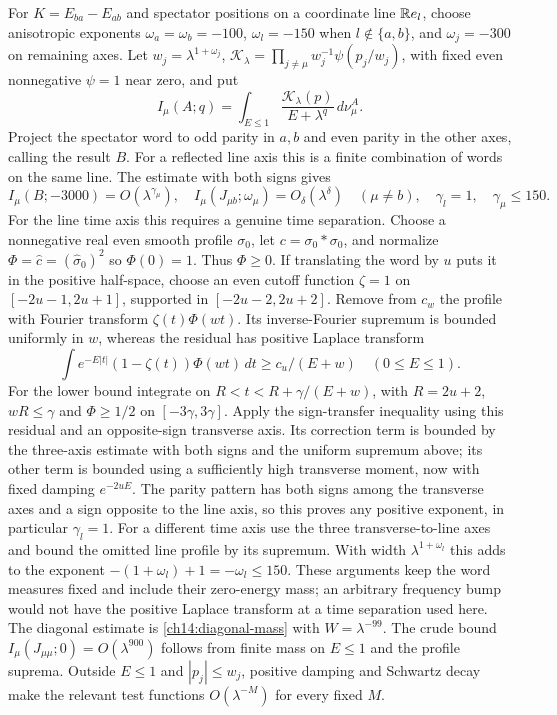For $K=E_{ba}-E_{ab}$ and spectator positions on a coordinate line
$\mathbb R e_l$, choose anisotropic exponents
$\omega_a=\omega_b=-100$, $\omega_l=-150$ when $l\notin\{a,b\}$,
and $\omega_j=-300$ on remaining axes. Let
$w_j=\lambda^{1+\omega_j}$,
$\mathcal K_\lambda=\prod_{j\ne\mu}w_j^{-1}\psi(p_j/w_j)$,
with fixed even nonnegative $\psi=1$ near zero, and put
\[
 I_\mu(A;q)=\int_{E\le1}\frac{\mathcal K_\lambda(p)}
                                  {E+\lambda^q}\,d\nu_\mu^A.
\]
Project the spectator word to odd parity in $a,b$ and even parity
in the other axes, calling the result $B$. For a reflected line
axis this is a finite combination of words on the same line.
The estimate with both signs gives
\[
 I_\mu(B;-3000)=O(\lambda^{\gamma_\mu}),\quad
 I_\mu(J_{\mu b};\omega_\mu)=O_\delta(\lambda^\delta)\quad(\mu\ne b),
 \quad\gamma_l=1,\quad\gamma_\mu\le150.
\]
For the line time axis this requires a genuine time separation.
Choose a nonnegative real even smooth profile $\sigma_0$, let
$c=\sigma_0*\sigma_0$, and normalize
$\Phi=\widehat c=(\widehat\sigma_0)^2$ so $\Phi(0)=1$.
Thus $\Phi\ge0$. If translating the word by $u$ puts it in the
positive half-space, choose an even cutoff function $\zeta=1$ on
$[-2u-1,2u+1]$, supported in $[-2u-2,2u+2]$.
Remove from $c_w$ the profile with Fourier transform
$\zeta(t)\Phi(wt)$. Its inverse-Fourier supremum is bounded
uniformly in $w$, whereas the residual has positive Laplace transform
\[
 \int e^{-E|t|}(1-\zeta(t))\Phi(wt)\,dt
                          \ge c_u/(E+w)\quad(0\le E\le1).
\]
For the lower bound integrate on
$R<t<R+\gamma/(E+w)$, with $R=2u+2$, $wR\le\gamma$ and
$\Phi\ge1/2$ on $[-3\gamma,3\gamma]$.
Apply the sign-transfer inequality using this residual and an
opposite-sign transverse axis. Its correction term is bounded by
the three-axis estimate with both signs and the uniform supremum above;
its other term is bounded using a sufficiently high transverse moment,
now with fixed damping $e^{-2uE}$. The parity pattern has both signs
among the transverse axes and a sign opposite to the line axis,
so this proves any positive exponent, in particular $\gamma_l=1$.
For a different time axis use the three transverse-to-line axes
and bound the omitted line profile by its supremum. With width
$\lambda^{1+\omega_l}$ this adds to the exponent
$-(1+\omega_l)+1=-\omega_l\le150$.
These arguments keep the word measures fixed and include their
zero-energy mass; an arbitrary frequency bump would not have the
positive Laplace transform at a time separation used here. The diagonal estimate is
\eqref{ch14:diagonal-mass} with $W=\lambda^{-99}$.
The crude bound $I_\mu(J_{\mu\mu};0)=O(\lambda^{900})$ follows
from finite mass on $E\le1$ and the profile suprema. Outside
$E\le1$ and $|p_j|\le w_j$, positive damping and Schwartz decay
make the relevant test functions $O(\lambda^{-M})$ for every fixed $M$.

